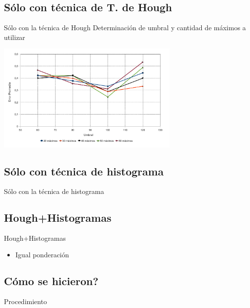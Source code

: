 \documentclass[spanish]{beamer}
\begin{document}
\subsection{Sólo con técnica de T. de Hough}
\begin{frame}{Sólo con la técnica de Hough}
  Determinación de umbral y cantidad de máximos a utilizar
  \begin{center}
    \includegraphics[width=9cm]{../diagramas/estadistica_noche_iguales}
  \end{center}
\end{frame}
%
\subsection{Sólo con técnica de histograma}
\begin{frame}{Sólo con la técnica de histograma}
\end{frame}
%
\subsection{Hough+Histogramas}
\begin{frame}{Hough+Histogramas}
  \begin{itemize}
  \item Igual ponderación
  \end{itemize}
\end{frame}
%
\subsection{Cómo se hicieron?}
\begin{frame}{Procedimiento}
  \begin{center}
  \end{center}
\end{frame}
%
\end{document}
